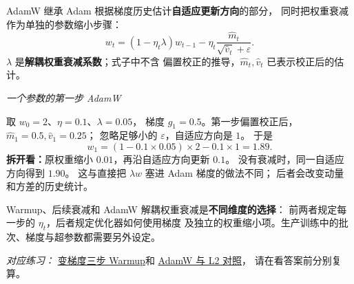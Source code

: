 AdamW 继承 Adam 根据梯度历史估计\textbf{自适应更新方向}的部分，
同时把权重衰减作为单独的参数缩小步骤：
\begin{equation}
w_t=(1-\eta_t\lambda)w_{t-1}
-\eta_t\frac{\widehat{m}_t}{\sqrt{\widehat{v}_t}+\varepsilon}.
\label{eq:adamw-decoupled}
\end{equation}
$\lambda$ 是\textbf{解耦权重衰减系数}；式子中不含
偏置校正的推导，$\widehat{m}_t,\widehat{v}_t$ 已表示校正后的估计。

\begin{example}
\noindent\emph{一个参数的第一步 AdamW}\par
取 $w_0=2$、$\eta=0.1$、$\lambda=0.05$，
梯度 $g_1=0.5$。第一步偏置校正后，
$\widehat{m}_1=0.5,\widehat{v}_1=0.25$；
忽略足够小的 $\varepsilon$，自适应方向是 $1$。
于是
\[
w_1=(1-0.1\times0.05)\times2-0.1\times1
=\boxed{1.89}.
\]
\textbf{拆开看：}原权重缩小 $0.01$，再沿自适应方向更新 $0.1$。
没有衰减时，同一自适应方向得到 $1.90$。
这与直接把 $\lambda w$ 塞进 Adam 梯度的做法不同；
后者会改变动量和方差的历史统计。
\end{example}

Warmup、后续衰减和 AdamW 解耦权重衰减是\textbf{不同维度的选择}：
前两者规定每一步的 $\eta_t$，后者规定优化器如何使用梯度
及独立的权重缩小项。生产训练中的批次、梯度与超参数都需要另外设定。


\noindent\emph{对应练习：}
\hyperref[exercise:optimizer-warmup]{变梯度三步 Warmup}和
\hyperref[exercise:optimizer-adamw]{AdamW 与 L2 对照}，
请在看答案前分别复算。

